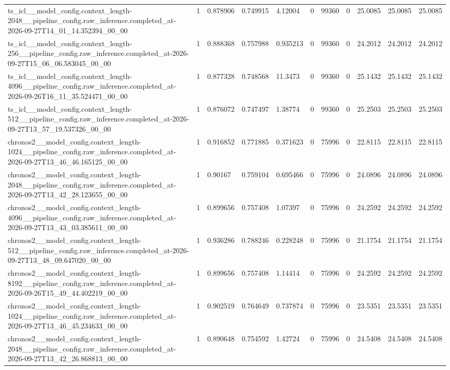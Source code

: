 \begin{tabular}{lllllllllll}
ts\_icl\_\_model\_config.context\_length-2048\_\_pipeline\_config.raw\_inference.completed\_at-2026-09-27T14\_01\_14.352394\_00\_00 & 1 & 0.878906 & 0.749915 & 4.12004 & 0 & 99360 & 0 & 25.0085 & 25.0085 & 25.0085 \\
ts\_icl\_\_model\_config.context\_length-256\_\_pipeline\_config.raw\_inference.completed\_at-2026-09-27T15\_06\_06.583045\_00\_00 & 1 & 0.888368 & 0.757988 & 0.935213 & 0 & 99360 & 0 & 24.2012 & 24.2012 & 24.2012 \\
ts\_icl\_\_model\_config.context\_length-4096\_\_pipeline\_config.raw\_inference.completed\_at-2026-09-26T16\_11\_35.524471\_00\_00 & 1 & 0.877328 & 0.748568 & 11.3473 & 0 & 99360 & 0 & 25.1432 & 25.1432 & 25.1432 \\
ts\_icl\_\_model\_config.context\_length-512\_\_pipeline\_config.raw\_inference.completed\_at-2026-09-27T13\_57\_19.537326\_00\_00 & 1 & 0.876072 & 0.747497 & 1.38774 & 0 & 99360 & 0 & 25.2503 & 25.2503 & 25.2503 \\
chronos2\_\_model\_config.context\_length-1024\_\_pipeline\_config.raw\_inference.completed\_at-2026-09-27T13\_46\_46.165125\_00\_00 & 1 & 0.916852 & 0.771885 & 0.371623 & 0 & 75996 & 0 & 22.8115 & 22.8115 & 22.8115 \\
chronos2\_\_model\_config.context\_length-2048\_\_pipeline\_config.raw\_inference.completed\_at-2026-09-27T13\_42\_28.123655\_00\_00 & 1 & 0.90167 & 0.759104 & 0.695466 & 0 & 75996 & 0 & 24.0896 & 24.0896 & 24.0896 \\
chronos2\_\_model\_config.context\_length-4096\_\_pipeline\_config.raw\_inference.completed\_at-2026-09-27T13\_43\_03.385611\_00\_00 & 1 & 0.899656 & 0.757408 & 1.07397 & 0 & 75996 & 0 & 24.2592 & 24.2592 & 24.2592 \\
chronos2\_\_model\_config.context\_length-512\_\_pipeline\_config.raw\_inference.completed\_at-2026-09-27T13\_48\_09.647020\_00\_00 & 1 & 0.936286 & 0.788246 & 0.228248 & 0 & 75996 & 0 & 21.1754 & 21.1754 & 21.1754 \\
chronos2\_\_model\_config.context\_length-8192\_\_pipeline\_config.raw\_inference.completed\_at-2026-09-26T15\_49\_44.402219\_00\_00 & 1 & 0.899656 & 0.757408 & 1.14414 & 0 & 75996 & 0 & 24.2592 & 24.2592 & 24.2592 \\
chronos2\_\_model\_config.context\_length-1024\_\_pipeline\_config.raw\_inference.completed\_at-2026-09-27T13\_46\_45.234633\_00\_00 & 1 & 0.902519 & 0.764649 & 0.737874 & 0 & 75996 & 0 & 23.5351 & 23.5351 & 23.5351 \\
chronos2\_\_model\_config.context\_length-2048\_\_pipeline\_config.raw\_inference.completed\_at-2026-09-27T13\_42\_26.868813\_00\_00 & 1 & 0.890648 & 0.754592 & 1.42724 & 0 & 75996 & 0 & 24.5408 & 24.5408 & 24.5408 \\

\end{tabular}
